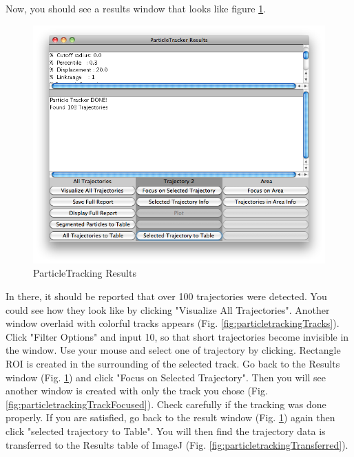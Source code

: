 \documentclass[11pt,a4paper,oneside]{report}
\begin{document}
Now, you should see a results window that looks like figure \ref{fig:particletrackingresults}.
\begin{figure}[htbp]
\begin{center}
\includegraphics[scale=0.45]{fig/fig253_ParticleTrackerResults.png}
\caption{ParticleTracking Results}
\label{fig:particletrackingresults}
\end{center}
\end{figure}
In there, it should be reported that over 100 trajectories were detected. You could see how they look like by clicking "Visualize All Trajectories". Another window overlaid with colorful tracks appears (Fig. \ref{fig:particletrackingTracks}). Click "Filter Options" and input 10, so that short trajectories become invisible in the window. Use your mouse and select one of trajectory by clicking. Rectangle ROI is created in the surrounding of the selected track. Go back to the Results window (Fig. \ref{fig:particletrackingresults}) and click "Focus on Selected Trajectory". Then you will see another window is created with only the track you chose (Fig. \ref{fig:particletrackingTrackFocused}). Check carefully if the tracking was done properly. If you are satisfied, go back to the result window (Fig. \ref{fig:particletrackingresults}) again then click "selected trajectory to Table". You will then find the trajectory data is transferred to the Results table of ImageJ (Fig. \ref{fig:particletrackingTransferred}). 
 
\end{document}
